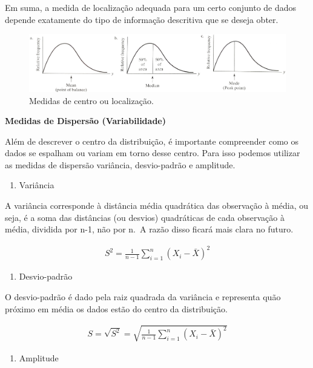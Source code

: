 \documentclass[
]{book}
\providecommand{\tightlist}{%
  \setlength{\itemsep}{0pt}\setlength{\parskip}{0pt}}
\theoremstyle{definition}
\theoremstyle{definition}
\theoremstyle{definition}
\theoremstyle{remark}
\begin{document}
Em suma, a medida de localização adequada para um certo conjunto de dados depende exatamente do tipo de informação descritiva que se deseja obter.

\begin{figure}
\includegraphics[width=1\linewidth]{img/medidas-de-centro} \caption{Medidas de centro ou localização.}\label{fig:ch1-medidas-localizacao}
\end{figure}

\textbf{Medidas de Dispersão (Variabilidade)}

Além de descrever o centro da distribuição, é importante compreender como os dados se espalham ou variam em torno desse centro. Para isso podemos utilizar as medidas de dispersão variância, desvio-padrão e amplitude.

\begin{enumerate}
\def\labelenumi{\alph{enumi}.}
\tightlist
\item
  Variância
\end{enumerate}

A variância corresponde à distância média quadrática das observação à média, ou seja, é a soma das distâncias (ou desvios) quadráticas de cada observação à média, dividida por n-1, não por n.~A razão disso ficará mais clara no futuro.

\begin{align*}
  S^2 = \frac{1}{n-1}\sum_{i=1}^n (X_i - \bar{X})^2
\end{align*}

\begin{enumerate}
\def\labelenumi{\alph{enumi}.}
\setcounter{enumi}{1}
\tightlist
\item
  Desvio-padrão
\end{enumerate}

O desvio-padrão é dado pela raiz quadrada da variância e representa quão próximo em média os dados estão do centro da distribuição.

\begin{align*}
  S = \sqrt{S^2} = \sqrt{\frac{1}{n-1}\sum_{i=1}^n (X_i - \bar{X})^2}
\end{align*}

\begin{enumerate}
\def\labelenumi{\alph{enumi}.}
\setcounter{enumi}{2}
\tightlist
\item
  Amplitude
\end{enumerate}
\end{document}
